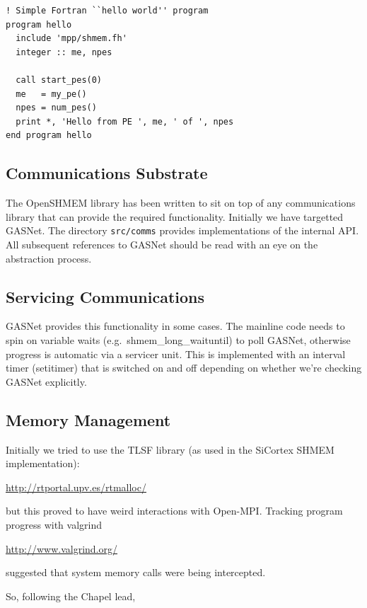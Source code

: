 \documentclass[english]{article}
\begin{document}
\vspace{0.1in}
\begin{minipage}{\linewidth}
\begin{lstlisting}
! Simple Fortran ``hello world'' program
program hello
  include 'mpp/shmem.fh'
  integer :: me, npes

  call start_pes(0)
  me   = my_pe()
  npes = num_pes()
  print *, 'Hello from PE ', me, ' of ', npes
end program hello
\end{lstlisting}
\end{minipage}

\subsection{Communications Substrate}

The OpenSHMEM library has been written to sit on top of any
communications library that can provide the required
functionality. Initially we have targetted GASNet. The
directory \texttt{src/comms} provides implementations of the
internal API. All subsequent references to GASNet should be read with
an eye on the abstraction process.

\subsection{Servicing Communications}

GASNet provides this functionality in some cases. The mainline code
needs to spin on variable waits (e.g.\ shmem\_long\_waituntil) to poll
GASNet, otherwise progress is automatic via a servicer unit.  This is
implemented with an interval timer (setitimer) that is switched on and
off depending on whether we're checking GASNet explicitly.

\subsection{Memory Management}

Initially we tried to use the TLSF library (as used in the SiCortex
SHMEM implementation):

\url{http://rtportal.upv.es/rtmalloc/}

but this proved to have weird interactions with Open-MPI. Tracking
program progress with valgrind

\url{http://www.valgrind.org/}

suggested that system memory calls were
being intercepted.

So, following the Chapel lead,
\end{document}
